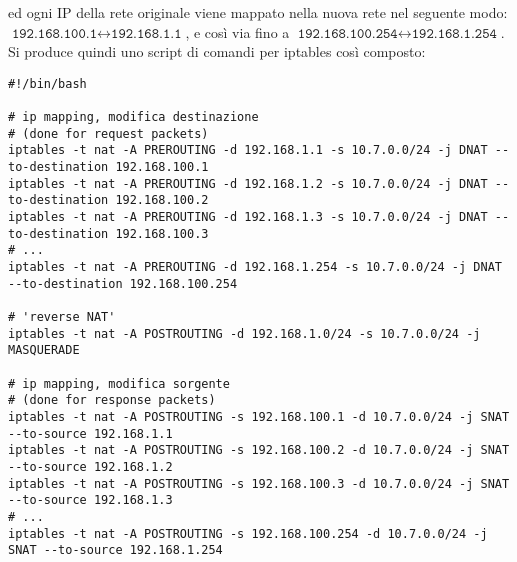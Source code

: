 ed ogni IP della rete originale viene mappato nella nuova rete nel seguente
modo: $\texttt{192.168.100.1} \leftrightarrow \texttt{192.168.1.1}$, e così via
fino a $\texttt{192.168.100.254} \leftrightarrow \texttt{192.168.1.254}$.
Si produce quindi uno script di comandi per iptables così composto:
\begin{verbatim}
#!/bin/bash

# ip mapping, modifica destinazione
# (done for request packets)
iptables -t nat -A PREROUTING -d 192.168.1.1 -s 10.7.0.0/24 -j DNAT --to-destination 192.168.100.1
iptables -t nat -A PREROUTING -d 192.168.1.2 -s 10.7.0.0/24 -j DNAT --to-destination 192.168.100.2
iptables -t nat -A PREROUTING -d 192.168.1.3 -s 10.7.0.0/24 -j DNAT --to-destination 192.168.100.3
# ...
iptables -t nat -A PREROUTING -d 192.168.1.254 -s 10.7.0.0/24 -j DNAT --to-destination 192.168.100.254

# 'reverse NAT'
iptables -t nat -A POSTROUTING -d 192.168.1.0/24 -s 10.7.0.0/24 -j MASQUERADE

# ip mapping, modifica sorgente
# (done for response packets)
iptables -t nat -A POSTROUTING -s 192.168.100.1 -d 10.7.0.0/24 -j SNAT --to-source 192.168.1.1
iptables -t nat -A POSTROUTING -s 192.168.100.2 -d 10.7.0.0/24 -j SNAT --to-source 192.168.1.2
iptables -t nat -A POSTROUTING -s 192.168.100.3 -d 10.7.0.0/24 -j SNAT --to-source 192.168.1.3
# ...
iptables -t nat -A POSTROUTING -s 192.168.100.254 -d 10.7.0.0/24 -j SNAT --to-source 192.168.1.254
\end{verbatim}

